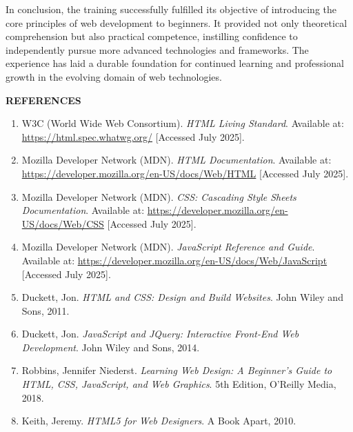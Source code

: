 \documentclass[a4paper,12pt,oneside]{report}
\numberwithin{equation}{chapter}
\numberwithin{figure}{chapter}
\numberwithin{table}{chapter}
\begin{document}
In conclusion, the training successfully fulfilled its objective of introducing the core principles of web development to beginners. It provided not only theoretical comprehension but also practical competence, instilling confidence to independently pursue more advanced technologies and frameworks. The experience has laid a durable foundation for continued learning and professional growth in the evolving domain of web technologies.


\newpage
\begin{center}
    \Large\textbf{REFERENCES}
\end{center}

\begin{enumerate}
    \item W3C (World Wide Web Consortium). \textit{HTML Living Standard}. Available at: \url{https://html.spec.whatwg.org/} [Accessed July 2025].

    \item Mozilla Developer Network (MDN). \textit{HTML Documentation}. Available at: \url{https://developer.mozilla.org/en-US/docs/Web/HTML} [Accessed July 2025].

    \item Mozilla Developer Network (MDN). \textit{CSS: Cascading Style Sheets Documentation}. Available at: \url{https://developer.mozilla.org/en-US/docs/Web/CSS} [Accessed July 2025].

    \item Mozilla Developer Network (MDN). \textit{JavaScript Reference and Guide}. Available at: \url{https://developer.mozilla.org/en-US/docs/Web/JavaScript} [Accessed July 2025].

    \item Duckett, Jon. \textit{HTML and CSS: Design and Build Websites}. John Wiley and Sons, 2011.

    \item Duckett, Jon. \textit{JavaScript and JQuery: Interactive Front-End Web Development}. John Wiley and Sons, 2014.

    \item Robbins, Jennifer Niederst. \textit{Learning Web Design: A Beginner’s Guide to HTML, CSS, JavaScript, and Web Graphics}. 5th Edition, O’Reilly Media, 2018.

    \item Keith, Jeremy. \textit{HTML5 for Web Designers}. A Book Apart, 2010.


\end{enumerate}
\end{document}
